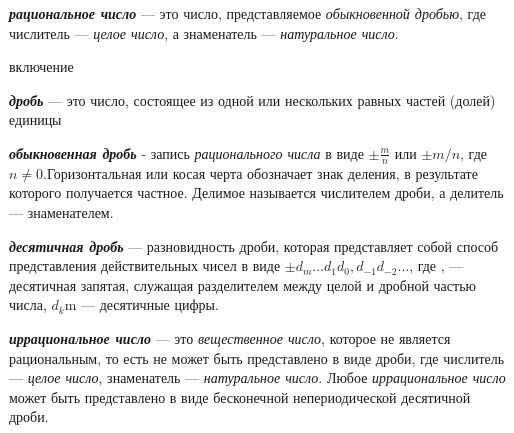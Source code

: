 \begin{SCn}
\begin{SCn}
\textbf{\textit{рациональное число}} --- это число, представляемое \textit{обыкновенной дробью}, где числитель — \textit{целое число}, а знаменатель — \textit{натуральное число}.

\begin{SCn}
\begin{scnrelfromlist}{включение}
\end{scnrelfromlist}
\end{SCn}

\textbf{\textit{дробь}} — это число, состоящее из одной или нескольких равных частей (долей) единицы

\begin{SCn}
\end{SCn}

\textbf{\textit{обыкновенная дробь}} - запись \textit{рационального числа} в виде ${\displaystyle \pm {\frac {m}{n}}}$ или ${\pm m/n}$, где ${n\neq 0}$.Горизонтальная или косая черта обозначает знак деления, в результате которого получается частное. Делимое называется числителем дроби, а делитель — знаменателем.

\begin{SCn}
\end{SCn}

\textbf{\textit{десятичная дробь}} — разновидность дроби, которая представляет собой способ представления действительных чисел в виде ${\pm d_m \ldots d_1 d_0{,} d_{-1} d_{-2} \ldots}$, где , — десятичная запятая, служащая разделителем между целой и дробной частью числа, ${d_{k}}$m — десятичные цифры.

\begin{SCn}
\end{SCn}

\textbf{\textit{иррациональное число}} --- это \textit{вещественное число}, которое не является рациональным, то есть не может быть представлено в виде дроби, где числитель — \textit{целое число}, знаменатель — \textit{натуральное число}. Любое \textit{иррациональное число} может быть представлено в виде бесконечной непериодической десятичной дроби.

\begin{SCn}
\end{SCn}


\end{SCn}
\end{SCn}
